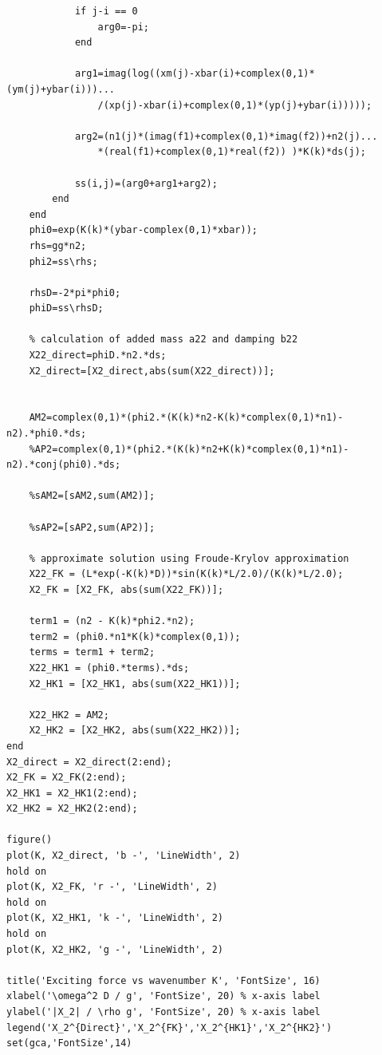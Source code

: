 \documentclass[a4paper,10pt]{article}
\begin{document}
\begin{verbatim}
            if j-i == 0
                arg0=-pi;
            end

            arg1=imag(log((xm(j)-xbar(i)+complex(0,1)*(ym(j)+ybar(i)))...
                /(xp(j)-xbar(i)+complex(0,1)*(yp(j)+ybar(i)))));

            arg2=(n1(j)*(imag(f1)+complex(0,1)*imag(f2))+n2(j)...
                *(real(f1)+complex(0,1)*real(f2)) )*K(k)*ds(j);

            ss(i,j)=(arg0+arg1+arg2);
        end
    end
    phi0=exp(K(k)*(ybar-complex(0,1)*xbar));
    rhs=gg*n2;
    phi2=ss\rhs;
    
    rhsD=-2*pi*phi0;
    phiD=ss\rhsD;
    
    % calculation of added mass a22 and damping b22
    X22_direct=phiD.*n2.*ds;
    X2_direct=[X2_direct,abs(sum(X22_direct))];
   

    AM2=complex(0,1)*(phi2.*(K(k)*n2-K(k)*complex(0,1)*n1)-n2).*phi0.*ds;
    %AP2=complex(0,1)*(phi2.*(K(k)*n2+K(k)*complex(0,1)*n1)-n2).*conj(phi0).*ds;
   
    %sAM2=[sAM2,sum(AM2)];
   
    %sAP2=[sAP2,sum(AP2)];
    
    % approximate solution using Froude-Krylov approximation
    X22_FK = (L*exp(-K(k)*D))*sin(K(k)*L/2.0)/(K(k)*L/2.0);
    X2_FK = [X2_FK, abs(sum(X22_FK))];
    
    term1 = (n2 - K(k)*phi2.*n2);
    term2 = (phi0.*n1*K(k)*complex(0,1));
    terms = term1 + term2;
    X22_HK1 = (phi0.*terms).*ds;
    X2_HK1 = [X2_HK1, abs(sum(X22_HK1))];
    
    X22_HK2 = AM2;
    X2_HK2 = [X2_HK2, abs(sum(X22_HK2))];
end
X2_direct = X2_direct(2:end);
X2_FK = X2_FK(2:end);
X2_HK1 = X2_HK1(2:end);
X2_HK2 = X2_HK2(2:end);

figure()
plot(K, X2_direct, 'b -', 'LineWidth', 2)
hold on
plot(K, X2_FK, 'r -', 'LineWidth', 2)
hold on
plot(K, X2_HK1, 'k -', 'LineWidth', 2)
hold on
plot(K, X2_HK2, 'g -', 'LineWidth', 2)

title('Exciting force vs wavenumber K', 'FontSize', 16)
xlabel('\omega^2 D / g', 'FontSize', 20) % x-axis label
ylabel('|X_2| / \rho g', 'FontSize', 20) % x-axis label
legend('X_2^{Direct}','X_2^{FK}','X_2^{HK1}','X_2^{HK2}')
set(gca,'FontSize',14)
\end{verbatim}
\end{document}
